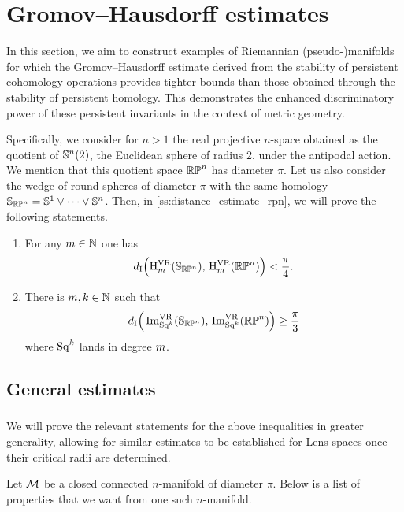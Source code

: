 
\section{Gromov--Hausdorff estimates}\label{s:gh_estimates}

In this section, we aim to construct examples of Riemannian (pseudo-)manifolds for which the Gromov--Hausdorff estimate derived from the stability of persistent cohomology operations provides tighter bounds than those obtained through the stability of persistent homology.
This demonstrates the enhanced discriminatory power of these persistent invariants in the context of metric geometry.

Specifically, we consider for \(n > 1\) the real projective \(n\)-space obtained as the quotient of \(\mathbb{S}^n(2)\), the Euclidean sphere of radius 2, under the antipodal action.
We mention that this quotient space \(\mathbb{RP}^n\) has diameter \(\pi\).
Let us also consider the wedge of round spheres of diameter \(\pi\) with the same homology \(\mathbb{S}_{\mathbb{RP}^n} = \mathbb{S}^1 \vee \dots \vee \mathbb{S}^n\).
Then, in \cref{ss:distance_estimate_rpn}, we will prove the following statements.

\begin{enumerate}
	\item For any \(m \in \mathbb{N}\) one has
	\[
	d_{\mathrm{I}}\Big(\mathrm{H}^{\mathrm{VR}}_m(\mathbb{S}_{\mathbb{RP}^n}),\, \mathrm{H}^{\mathrm{VR}}_m(\mathbb{RP}^n)\Big) < \frac{\pi}{4}.
	\]

	\item There is \(m, k \in \mathbb{N}\) such that
	\[
	d_{\mathrm{I}}\Big(\operatorname{Im}_{\mathrm{Sq}^k}^{\mathrm{VR}}(\mathbb{S}_{\mathbb{RP}^n}),\, \operatorname{Im}_{\mathrm{Sq}^k}^{\mathrm{VR}}(\mathbb{RP}^n)\Big) \geq \frac{\pi}{3}
	\]
	where \(\mathrm{Sq}^k\) lands in degree \(m\).
\end{enumerate}

\subsection{General estimates}\label{ss:genberal_distance_comparison}

\subsubsection{}

We will prove the relevant statements for the above inequalities in greater generality, allowing for similar estimates to be established for Lens spaces once their critical radii are determined.

Let $\mathcal{M}$ be a closed connected \(n\)-manifold of diameter $\pi$.
Below is a list of properties that we want from one such \(n\)-manifold.

